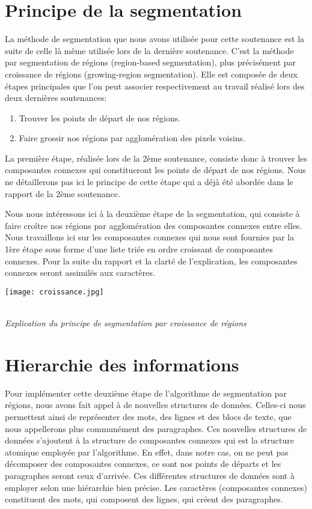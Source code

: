 \documentclass[a4paper,10pt]{report}
\begin{document}
\section{Principe de la segmentation}

La méthode de segmentation que nous avons utilisée pour cette soutenance est la suite
de celle là même utilisée lors de la dernière soutenance. C'est la méthode par segmentation
de régions (region-based segmentation), plus précis\'ement par croissance de régions
(growing-region segmentation). Elle est composée de deux étapes principales que l'on peut
associer respectivement au travail réalisé lors des deux dernières soutenances:

\begin{enumerate}
\item Trouver les points de départ de nos régions.
\item Faire grossir nos régions par agglomération des pixels voisins.
\end{enumerate}

La première étape, réalisée lors de la 2ème soutenance, consiste donc à trouver les
composantes connexes qui constitueront les points de départ de nos régions. Nous ne
détaillerons pas ici le principe de cette étape qui a déjà été abordée dans le rapport de la
2ème soutenance.

Nous nous intéressons ici à la deuxième étape de la segmentation, qui consiste à faire
croître nos régions par agglomération des composantes connexes entre elles. Nous
travaillons ici sur les composantes connexes qui nous sont fournies par la 1ère étape sous
forme d'une liste triée en ordre croissant de composantes connexes. Pour la suite du
rapport et la clarté de l'explication, les composantes connexes seront
assimilés aux caractères.

\begin{center}
  \texttt{[image: croissance.jpg]}
  \caption{\\\emph{Explication du principe de segmentation par croissance de r\'egions}}
\end{center}



\section{Hierarchie des informations}

Pour implémenter cette deuxième étape de l'algorithme de segmentation par régions,
nous avons fait appel à de nouvelles structures de données. Celles-ci nous permettent
ainsi de représenter des mots, des lignes et des blocs de texte, que nous appellerons plus
communément des paragraphes. Ces nouvelles structures de données s'ajoutent à la
structure de composantes connexes qui est la structure atomique employée par
l'algorithme. En effet, dans notre cas, on ne peut pas décomposer des composantes
connexes, ce sont nos points de départs et les paragraphes seront ceux d'arrivée. Ces
différentes structures de données sont à employer selon une hiérarchie bien précise. Les
caractères (composantes connexes) constituent des mots, qui composent des lignes, qui
créent des paragraphes.
\end{document}
